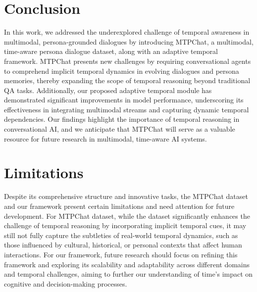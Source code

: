 \section{Conclusion}
In this work, we addressed the underexplored challenge of temporal awareness in multimodal, persona-grounded dialogues by introducing MTPChat, a multimodal, time-aware persona dialogue dataset, along with an adaptive temporal framework.
MTPChat presents new challenges by requiring conversational agents to comprehend implicit temporal dynamics in evolving dialogues and persona memories, thereby expanding the scope of temporal reasoning beyond traditional QA tasks. Additionally, our proposed adaptive temporal module has demonstrated significant improvements in model performance, underscoring its effectiveness in integrating multimodal streams and capturing dynamic temporal dependencies.
Our findings highlight the importance of temporal reasoning in conversational AI, and we anticipate that MTPChat will serve as a valuable resource for future research in multimodal, time-aware AI systems.
\section{Limitations}

Despite its comprehensive structure and innovative tasks, the MTPChat dataset and our framework present certain limitations and need attention for future development. For MTPChat dataset, while the dataset significantly enhances the challenge of temporal reasoning by incorporating implicit temporal cues, it may still not fully capture the subtleties of real-world temporal dynamics, such as those influenced by cultural, historical, or personal contexts that affect human interactions. For our framework, future research should focus on refining this framework and exploring its scalability and adaptability across different domains and temporal challenges, aiming to further our understanding of time's impact on cognitive and decision-making processes.


